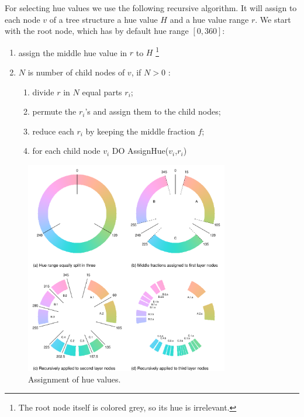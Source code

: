 \documentclass[journal]{vgtc}                %
\begin{document}
For selecting hue values we use the following recursive algorithm. It will assign to each node $v$ of a tree structure a hue value $H$ and a hue value range $r$.
We start with the root node, which has by default hue range $[0, 360]$:

\vspace{-1mm}\begin{enumerate} \itemsep1pt \parskip0pt 
\item assign the middle hue value in $r$ to $H$ \footnote{The root node itself is colored grey, so its hue is irrelevant.}
\item $N$ is number of child nodes of $v$, if $N>0$ :
\begin{enumerate}[i] \itemsep1pt \parskip0pt 
\item divide $r$ in $N$ equal parts $r_i$;
\item permute the $r_i$'s and assign them to the child nodes;
\item reduce each $r_i$ by keeping the middle fraction $f$;
\item for each child node $v_i$ DO AssignHue($v_i$,$r_i$)
\end{enumerate}
\end{enumerate}

\begin{figure}[htb]
  \centering
  \includegraphics[width=3.5in]{hcl_method2.pdf}
  \vspace{-5ex}
  \caption{Assignment of hue values.}\label{fig:wheel}
  \vspace{-4ex}
\end{figure}
\end{document}
